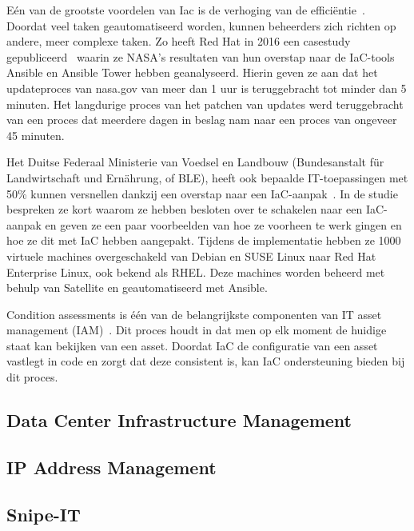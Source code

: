 E\'en van de grootste voordelen van Iac is de verhoging van de effici\"entie~\autocite{splunk-benefits-iac}.
Doordat veel taken geautomatiseerd worden, kunnen beheerders zich richten op andere, meer complexe taken.
Zo heeft Red Hat in 2016 een casestudy gepubliceerd~\autocite{case-study-nasa-iac} waarin ze NASA's resultaten van hun overstap naar de IaC-tools Ansible en Ansible Tower hebben geanalyseerd.
Hierin geven ze aan dat het updateproces van nasa.gov van meer dan 1 uur is teruggebracht tot minder dan 5 minuten.
Het langdurige proces van het patchen van updates werd teruggebracht van een proces dat meerdere dagen in beslag nam naar een proces van ongeveer 45 minuten.

Het Duitse Federaal Ministerie van Voedsel en Landbouw (Bundesanstalt f\"ur Landwirtschaft und Ern\"ahrung, of BLE), heeft ook bepaalde IT-toepassingen met 50\% kunnen versnellen dankzij een overstap naar een IaC-aanpak~\autocite{case-study-ble-iac}.
In de studie bespreken ze kort waarom ze hebben besloten over te schakelen naar een IaC-aanpak en geven ze een paar voorbeelden van hoe ze voorheen te werk gingen en hoe ze dit met IaC hebben aangepakt.
Tijdens de implementatie hebben ze 1000 virtuele machines overgeschakeld van Debian en SUSE Linux naar Red Hat Enterprise Linux, ook bekend als RHEL.
Deze machines worden beheerd met behulp van Satellite en geautomatiseerd met Ansible.

Condition assessments is één van de belangrijkste componenten van IT asset management (IAM)~\autocite{ibm-what-is-iam}.
Dit proces houdt in dat men op elk moment de huidige staat kan bekijken van een asset.
Doordat IaC de configuratie van een asset vastlegt in code en zorgt dat deze consistent is, kan IaC ondersteuning bieden bij dit proces.

\subsection{Data Center Infrastructure Management}
\label{sub:dcim}

\subsection{IP Address Management}
\label{sub:ipam}

\subsection{Snipe-IT}
\label{sub:snipe-it}

